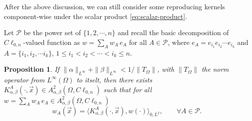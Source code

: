 \documentclass[12pt]{article}
\newtheorem{proposition}[theorem]{Proposition}
\begin{document}
After the above discussion, we can still consider some reproducing kernels component-wise under the scalar product \eqref{eq:scalar-product}. 

Let $\mathcal{P}$ be the power set of $\{1,2, \cdots, n\}$ and recall the basic decomposition of $C\ell_{0,n}$-valued function as $w=\sum_{A} w_A\,e_A$ for all $A\in \mathcal{P}$, where $e_A=e_{i_1}e_{i_2}\cdots e_{i_k}$ and $A=\{i_1, i_2, \cdots i_k\}$, $1\leq i_1<i_2<\cdots <i_k\leq n$.

\begin{proposition}\label{prop:existence}
If $\|\alpha\|_{L^{\infty}}+\|\beta \|_{L^{\infty}}< 1/\|T_{\Omega}\|$, with $\|T_{\Omega}\|$ the norm operator from $L^{\infty}(\Omega)$ to itselt, then there exists $K_{\alpha,\beta}^A(\cdot, \vec x)\in A_{\alpha,\beta}^2(\Omega,C\ell_{0,n})$ such that for all $w=\sum_{A} w_A\, e_A\in A_{\alpha,\beta}^2(\Omega,C\ell_{0,n})$
\begin{equation}\label{eq:reproducing-property}
w_A(\vec x)=\langle K_{\alpha,\beta}^A(\cdot, \vec x), w(\cdot) \rangle_{0,L^2}, \qquad \forall A\in \mathcal{P}.         
\end{equation}
\end{proposition}
\end{document}

